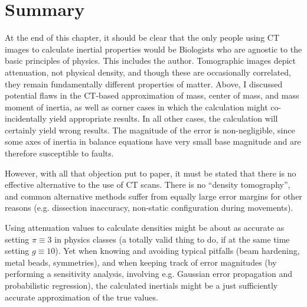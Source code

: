 \clearpage
\section{Summary}
\label{sec:orge3e81b3}
At the end of this chapter, it should be clear that the only people using CT images to calculate inertial properties would be Biologists who are agnostic to the basic principles of physics.
This includes the author.
Tomographic images depict attenuation, not physical density, and though these are occasionally correlated, they remain fundamentally different properties of matter.
Above, I discussed potential flaws in the CT-based approximation of mass, center of mass, and mass moment of inertia, as well as corner cases in which the calculation might co-incidentally yield appropriate results.
In all other cases, the calculation will certainly yield wrong results.
The magnitude of the error is non-negligible, since some axes of inertia in balance equations have very small base magnitude and are therefore susceptible to faults.


However, with all that objection put to paper, it must be stated that there is no effective alternative to the use of CT scans.
There is no ``density tomography'', and common alternative methods suffer from equally large error margins for other reasons (e.g. dissection inaccuracy, non-static configuration during movements).

Using attenuation values to calculate densities might be about as accurate as setting \(\pi \equiv 3\) in physics classes (a totally valid thing to do, if at the same time setting \(g \equiv 10\)).
Yet when knowing and avoiding typical pitfalls (beam hardening, metal beads, symmetries), and when keeping track of error magnitudes (by performing a sensitivity analysis, involving e.g. Gaussian error propagation and probabilistic regression), the calculated inertials might be a just sufficiently accurate approximation of the true values.



\clearpage



